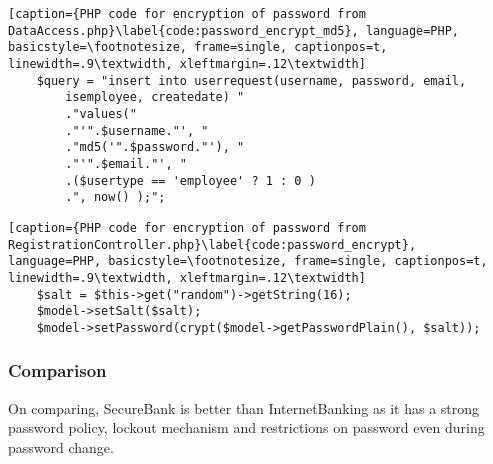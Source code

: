 \begin{lstlisting}[caption={PHP code for encryption of password from DataAccess.php}\label{code:password_encrypt_md5}, language=PHP, basicstyle=\footnotesize, frame=single, captionpos=t, linewidth=.9\textwidth, xleftmargin=.12\textwidth]
    $query = "insert into userrequest(username, password, email,
        isemployee, createdate) "
        ."values("
        ."'".$username."', "
        ."md5('".$password."'), "
        ."'".$email."', "
        .($usertype == 'employee' ? 1 : 0 )
        .", now() );";
\end{lstlisting}

\begin{lstlisting}[caption={PHP code for encryption of password from RegistrationController.php}\label{code:password_encrypt}, language=PHP, basicstyle=\footnotesize, frame=single, captionpos=t, linewidth=.9\textwidth, xleftmargin=.12\textwidth]
    $salt = $this->get("random")->getString(16);
    $model->setSalt($salt);
    $model->setPassword(crypt($model->getPasswordPlain(), $salt));
\end{lstlisting}

\subsubsection{Comparison}
On comparing, SecureBank is better than InternetBanking as it has a strong password policy, lockout mechanism and restrictions on password even during password change.
\clearpage